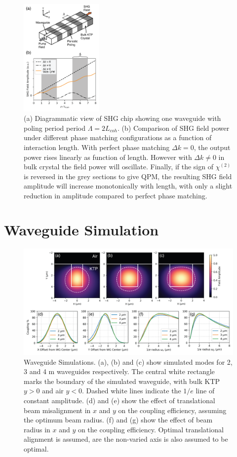 \documentclass[9pt,twocolumn,twoside]{pnas-new}
\begin{document}
\begin{figure}
	\centering
	\includegraphics[width = 0.36\textwidth]{pedagogy}
	\caption{(a) Diagrammatic view of SHG chip showing one waveguide with poling period period $\Lambda = 2 L_{coh}$. (b) Comparison of SHG field power under different phase matching configurations as a function of interaction length. With perfect phase matching $\Delta k = 0$, the output power rises linearly as function of length. However with $\Delta k \neq 0$ in bulk crystal the field power will oscillate. Finally, if the sign of $\chi^{(2)}$ is reversed in the grey sections to give QPM, the resulting SHG field amplitude will increase monotonically with length, with only a slight reduction in amplitude compared to perfect phase matching.}
	\label{fig:pedagog}
\end{figure}

\section*{Waveguide Simulation}

\begin{figure}
	\centering
	\includegraphics[width = \textwidth]{WG_sim_fig}
	\caption{Waveguide Simulations. (a), (b) and (c) show simulated modes for 2, 3 and 4 \textmu m waveguides respectively. The central white rectangle marks the boundary of the simulated waveguide, with bulk KTP $y>0$ and air $y<0$. Dashed white lines indicate the $1/e$ line of constant amplitude. (d) and (e) show the effect of translational beam misalignment in $x$ and $y$ on the coupling efficiency, assuming the optimum beam radius. (f) and (g) show the effect of beam radius in $x$ and $y$ on the coupling efficiency. Optimal translational alignment is assumed, are the non-varied axis is also assumed to be optimal.}
	\label{fig:wgsim}
\end{figure}	
\end{document}
